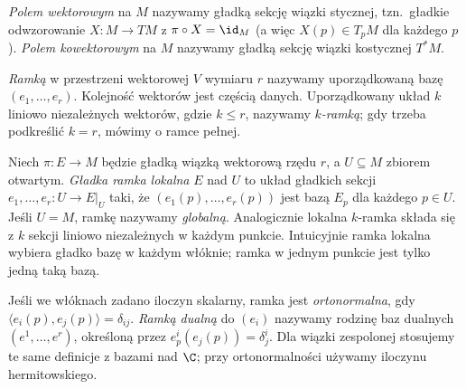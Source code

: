 \begin{definicja}
\emph{Polem wektorowym} na $M$ nazywamy gładką sekcję wiązki stycznej, tzn.\ gładkie
odwzorowanie $X\colon M\to TM$ z $\pi\circ X=\id_M$ (a więc $X(p)\in T_pM$ dla każdego
$p$). \emph{Polem kowektorowym} na $M$ nazywamy gładką sekcję wiązki kostycznej $T^*M$.
\end{definicja}

\begin{definicja}
\label{def:ramka-lokalna}
\emph{Ramką} w przestrzeni wektorowej $V$ wymiaru $r$
nazywamy uporządkowaną bazę $(e_1,\ldots,e_r)$.
Kolejność wektorów jest częścią danych.
Uporządkowany układ $k$ liniowo niezależnych wektorów,
gdzie $k\leq r$, nazywamy \emph{$k$-ramką};
gdy trzeba podkreślić $k=r$, mówimy o ramce pełnej.

Niech $\pi:E\to M$ będzie gładką wiązką wektorową rzędu $r$,
a $U\subseteq M$ zbiorem otwartym.
\emph{Gładka ramka lokalna} $E$ nad $U$ to układ
gładkich sekcji $e_1,\ldots,e_r:U\to E|_U$ taki, że
$(e_1(p),\ldots,e_r(p))$ jest bazą $E_p$ dla każdego $p\in U$.
Jeśli $U=M$, ramkę nazywamy \emph{globalną}.
Analogicznie lokalna $k$-ramka składa się z $k$ sekcji
liniowo niezależnych w każdym punkcie.
Intuicyjnie ramka lokalna wybiera gładko bazę w każdym włóknie;
ramka w jednym punkcie jest tylko jedną taką bazą.

Jeśli we włóknach zadano iloczyn skalarny, ramka jest
\emph{ortonormalna}, gdy
$\langle e_i(p),e_j(p)\rangle=\delta_{ij}$.
\emph{Ramką dualną} do $(e_i)$ nazywamy rodzinę baz dualnych
$(e^1,\ldots,e^r)$, określoną przez
$e^i_p(e_j(p))=\delta^i_j$.
Dla wiązki zespolonej stosujemy te same definicje z bazami
nad $\C$; przy ortonormalności używamy iloczynu hermitowskiego.
\end{definicja}

